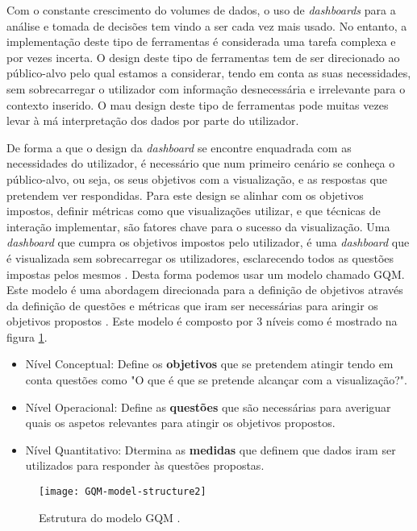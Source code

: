Com o constante crescimento do volumes de dados, o uso de \textit{dashboards} para a análise e tomada de decisões tem vindo a ser cada vez mais usado. No entanto, a implementação deste tipo de ferramentas é considerada uma tarefa complexa e por vezes incerta. O design deste tipo de ferramentas tem de ser direcionado ao público-alvo pelo qual estamos a considerar, tendo em conta as suas necessidades, sem sobrecarregar o utilizador com informação desnecessária e irrelevante para o contexto inserido. O mau design deste tipo de ferramentas pode muitas vezes levar à má interpretação dos dados por parte do utilizador.

De forma a que o design da \textit{dashboard} se encontre enquadrada com as necessidades do utilizador, é necessário que num primeiro cenário se conheça o público-alvo, ou seja, os seus objetivos com a visualização, e as respostas que pretendem ver respondidas. Para este design se alinhar com os objetivos impostos, definir métricas como que visualizações utilizar, e que técnicas de interação implementar, são fatores chave para o sucesso da visualização. Uma \textit{dashboard} que cumpra os objetivos impostos pelo utilizador, é uma \textit{dashboard} que é visualizada sem sobrecarregar os utilizadores, esclarecendo todos as questões impostas pelos mesmos \cite{pappas2011riding}. Desta forma podemos usar um modelo chamado \gls{GQM}. Este modelo é uma abordagem direcionada para a definição de objetivos através da definição de questões e métricas que iram ser necessárias para aringir os objetivos propostos \cite{janes2013effective}. Este modelo é composto por 3 níveis como é mostrado na figura \ref{fig:gqm-model}.

\begin{itemize}
  \item Nível Conceptual: Define os \textbf{objetivos} que se pretendem atingir tendo em conta questões como "O que é que se pretende alcançar com a visualização?".
  \item Nível Operacional: Define as \textbf{questões} que são necessárias para averiguar quais os aspetos relevantes para atingir os objetivos propostos. 
  \item Nível Quantitativo: Dtermina as \textbf{medidas} que definem que dados iram ser utilizados para responder às questões propostas.
\end{itemize}

\begin{figure}[htbp]
  \centering
  \texttt{[image: GQM-model-structure2]}
  \caption{Estrutura do modelo \gls{GQM} \cite{article}.}
  \label{fig:gqm-model}
\end{figure}


